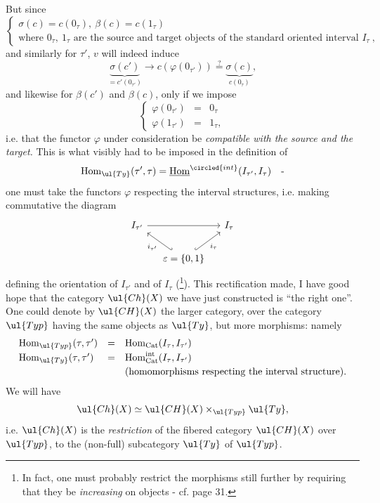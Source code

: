 
But since
\[
\left\{
\begin{array}{l}
\sigma(c)=c(0_\tau),\ \beta(c)=c(1_\tau)\\[1ex]
\text{where } 0_\tau,\ 1_\tau \text{ are the source and target objects of the standard oriented interval } I_\tau\ ,
\end{array}
\right.
\]
and similarly for $\tau'$, $v$ will indeed induce
\[
\underbrace{\sigma(c')}_{=c'(0_{\tau'})} \longrightarrow c(\varphi(0_{\tau'})) \overset{?}{=} \underbrace{\sigma(c)}_{c(0_\tau)},
\]
and likewise for $\beta(c')$ and $\beta(c)$, only if we impose
\[
\boxed{
\left\{
\begin{array}{lcl}
\varphi(0_{\tau'}) & = & 0_\tau\\
\varphi(1_{\tau'}) & = & 1_\tau,
\end{array}
\right.
}
\]
i.e. that the functor $\varphi$ under consideration be \textit{compatible with the source and the target.} This is what visibly had to be imposed in the definition of %
\[
\mathrm{Hom}_{\ul{Ty}}(\tau',\tau)=\underline{\mathrm{Hom}}^{\circled{int}}(I_{\tau'},I_\tau)\quad\text{-}
\]
one must take the functors $\varphi$ respecting the interval structures, i.e. making commutative the diagram
\[
\begin{tikzcd}[column sep=small]
I_{\tau'} \arrow[rr] & & I_\tau \\
& \varepsilon=\{0,1\} \arrow[ul, hook', "i_{\tau'}"] \arrow[ur, hook, "i_\tau"'] &
\end{tikzcd}
\]
defining the orientation of $I_{\tau'}$ and of $I_\tau$ (\footnote[10]{In fact, one must probably restrict the morphisms still further by requiring that they be \textit{increasing} on objects - cf. page 31.}). This rectification made, I have good hope that the category $\ul{Ch}(X)$ we have just constructed is ``the right one''. One could denote by $\ul{CH}(X)$ the larger category, over the category $\ul{Typ}$ having the same objects as $\ul{Ty}$, but more morphisms: namely %
\[
\begin{array}{lcl}
\mathrm{Hom}_{\ul{Typ}}(\tau,\tau') & = & \mathrm{Hom}_{\mathrm{Cat}}(I_\tau,I_{\tau'})\\[0.5ex]
\mathrm{Hom}_{\ul{Ty}}(\tau,\tau') & = & \mathrm{Hom}^{\mathrm{int}}_{\mathrm{Cat}}(I_\tau,I_{\tau'})\\[0.5ex]
 & & \text{(homomorphisms respecting the interval structure).}
\end{array}
\]
We will have
\[
\ul{Ch}(X)\simeq\ul{CH}(X)\times_{\ul{Typ}}\ul{Ty},
\]
i.e. $\ul{Ch}(X)$ is the \textit{restriction} of the fibered category $\ul{CH}(X)$ over $\ul{Typ}$, to the (non-full) subcategory $\ul{Ty}$ of $\ul{Typ}$.

